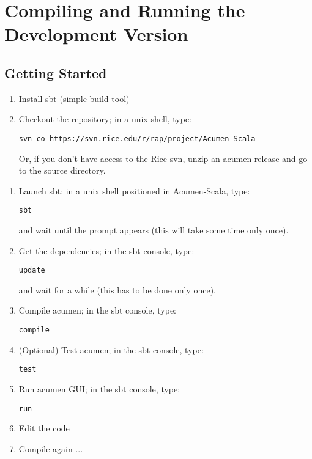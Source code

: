 \section{Compiling and Running the Development Version}

\subsection{Getting Started}

\begin{enumerate}

   \item Install sbt (simple build tool)
   \item Checkout the repository; in a unix shell, type:

\begin{lstlisting}
svn co https://svn.rice.edu/r/rap/project/Acumen-Scala
\end{lstlisting}

    Or, if you don't have access to the Rice svn, unzip an acumen release and go to the source directory. 

\end{enumerate}
\begin{enumerate}

   \item Launch sbt; in a unix shell positioned in Acumen-Scala, type:

\begin{lstlisting}
sbt
\end{lstlisting}

          and wait until the prompt appears (this will take some time only once). 

   \item Get the dependencies; in the sbt console, type:

\begin{lstlisting}
update
\end{lstlisting}

          and wait for a while (this has to be done only once). 

   \item Compile acumen; in the sbt console, type:

\begin{lstlisting}
compile
\end{lstlisting}

   \item (Optional) Test acumen; in the sbt console, type:

\begin{lstlisting}
test
\end{lstlisting}

   \item Run acumen GUI; in the sbt console, type:

\begin{lstlisting}
run
\end{lstlisting}

   \item Edit the code
   \item Compile again ... 

\end{enumerate}
